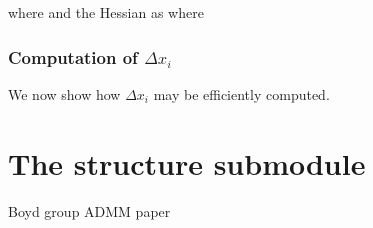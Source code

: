 \documentclass{book}
\begin{document}
    where
    and the Hessian as 
    where



\subsubsection{Computation of $\Delta x_i$}
We now show how $\Delta x_i$ may be efficiently computed.

\section{The structure submodule}


\begin{thebibliography}{99}
 Boyd group ADMM paper
\end{thebibliography}
\end{document}

